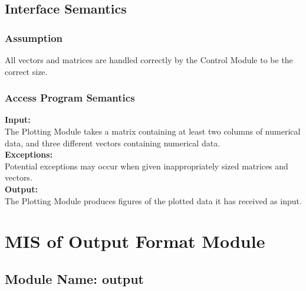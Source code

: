 \documentclass[12pt]{article}
\begin{document}
\subsection{Interface Semantics}


\subsubsection{Assumption}
All vectors and matrices are handled correctly by the Control Module to be the correct size.


\subsubsection{Access Program Semantics}
\noindent \textbf{Input:}\\
The Plotting Module takes a matrix containing at least two columns of numerical
data, and three different vectors containing numerical data.\\

\noindent \textbf{Exceptions:}\\
Potential exceptions may occur when given inappropriately sized
matrices and vectors.\\

\noindent \textbf{Output:}\\
The Plotting Module produces figures of the plotted data it has received as input.



\section{MIS of Output Format Module}

\subsection{Module Name: output}

\end{document}
